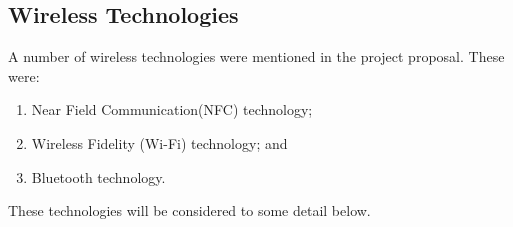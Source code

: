 \documentclass[12pt,svgnames,smaller]{article} %
\begin{document}
	\subsection{Wireless Technologies}
	
	A number of wireless technologies were mentioned in the project proposal. These were:
	
	\begin{enumerate}
		\item Near Field Communication(NFC) technology;
		\item Wireless Fidelity (Wi-Fi) technology; and
		\item Bluetooth technology. 
	\end{enumerate}
	
	These technologies will be considered to some detail below.
	
\end{document}
